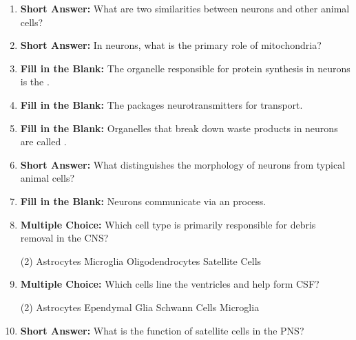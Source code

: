 \begin{enumerate}[label=\textbf{Q2.1.\arabic*}]
      \item \textbf{Short Answer:} What are two similarities between neurons and other animal cells? \\
      \item \textbf{Short Answer:} In neurons, what is the primary role of mitochondria? \\
      \item \textbf{Fill in the Blank:} The organelle responsible for protein synthesis in neurons is the \underline{\hspace{3cm}}. \\
      \item \textbf{Fill in the Blank:} The \underline{\hspace{3cm}} packages neurotransmitters for transport. \\
      \item \textbf{Fill in the Blank:} Organelles that break down waste products in neurons are called \underline{\hspace{3cm}}. \\
      \item \textbf{Short Answer:} What distinguishes the morphology of neurons from typical animal cells? \\
      \item \textbf{Fill in the Blank:} Neurons communicate via an \underline{\hspace{3cm}} process. \\
      \item \textbf{Multiple Choice:} Which cell type is primarily responsible for debris removal in the CNS?
            \begin{tasks}[label=(\Alph*), label-width=1.5em, item-indent=1.7em](2)
                  \task Astrocytes
                  \task Microglia
                  \task Oligodendrocytes
                  \task Satellite Cells
            \end{tasks}
      \item \textbf{Multiple Choice:} Which cells line the ventricles and help form CSF?
            \begin{tasks}[label=(\Alph*), label-width=1.5em, item-indent=1.7em](2)
                  \task Astrocytes
                  \task Ependymal Glia
                  \task Schwann Cells
                  \task Microglia
            \end{tasks}
      \item \textbf{Short Answer:} What is the function of satellite cells in the PNS? \\


\end{enumerate}
